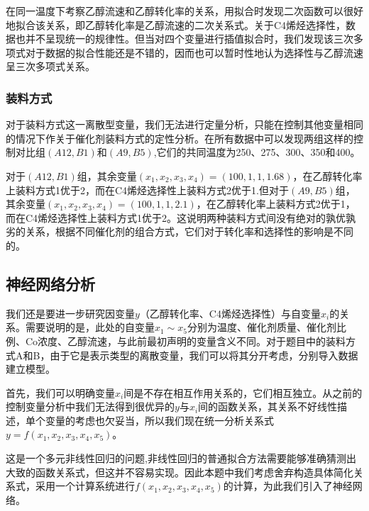 \documentclass{article}
\begin{document}
	在同一温度下考察乙醇流速和乙醇转化率的关系，用拟合时发现二次函数可以很好地拟合该关系，即乙醇转化率是乙醇流速的二次关系式。关于C4烯烃选择性，数据也并不呈现统一的规律性。但当对四个变量进行插值拟合时，我们发现该三次多项式对于数据的拟合性能还是不错的，因而也可以暂时性地认为选择性与乙醇流速呈三次多项式关系。
	\subsubsection{装料方式}
	对于装料方式这一离散型变量，我们无法进行定量分析，只能在控制其他变量相同的情况下作关于催化剂装料方式的定性分析。在所有数据中可以发现两组这样的控制对比组$(A12,B1)$和$(A9,B5)$,它们的共同温度为250、275、300、350和400。
	
	对于$(A12,B1)$组，其余变量$(x_1,x_2,x_3,x_4)=(100,1,1,1.68)$，在乙醇转化率上装料方式1优于2，而在C4烯烃选择性上装料方式2优于1.但对于$(A9,B5)$组，其余变量$(x_1,x_2,x_3,x_4)=(100,1,1,2.1)$，在乙醇转化率上装料方式2优于1，而在C4烯烃选择性上装料方式1优于2。这说明两种装料方式间没有绝对的孰优孰劣的关系，根据不同催化剂的组合方式，它们对于转化率和选择性的影响是不同的。
		
	\subsection{神经网络分析}
	我们还是要进一步研究因变量$y$（乙醇转化率、C4烯烃选择性）与自变量$x_i$的关系。需要说明的是，此处的自变量$x_1\sim x_5$分别为温度、催化剂质量、催化剂比例、Co浓度、乙醇流速，与此前最初声明的变量含义不同。对于题目中的装料方式A和B，由于它是表示类型的离散变量，我们可以将其分开考虑，分别导入数据建立模型。
	
	首先，我们可以明确变量$x_i$间是不存在相互作用关系的，它们相互独立。从之前的控制变量分析中我们无法得到很优异的$y$与$x_i$间的函数关系，其关系不好线性描述，单个变量的考虑也欠妥当，所以我们现在统一分析关系式$y=f(x_1,x_2,x_3,x_4,x_5)$。
	
	这是一个多元非线性回归的问题,非线性回归的普通拟合方法需要能够准确猜测出大致的函数关系式，但这并不容易实现。因此本题中我们考虑舍弃构造具体简化关系式，采用一个计算系统进行$f(x_1,x_2,x_3,x_4,x_5)$的计算，为此我们引入了神经网络。
\end{document}
